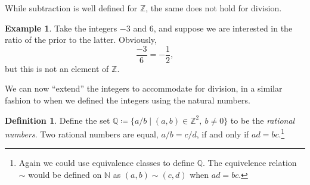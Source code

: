\documentclass{article}
\newcommand{\N}{\mathbb{N}}
\newcommand{\Q}{\mathbb{Q}}
\newcommand{\Z}{\mathbb{Z}}
\theoremstyle{definition}
\newtheorem{definition}{Definition}[section]
\newtheorem{example}{Example}[section]
\begin{document}
	While subtraction is well defined for $ \Z $, the same does not hold for division. 
	\begin{example}
		Take the integers $ -3 $ and 6, and suppose we are interested in the ratio of the prior to the latter. Obviously, $$ \frac{-3}{6}=-\frac{1}{2} ,$$ but this is not an element of $ \Z $. 
	\end{example}
	We can now ``extend'' the integers to accommodate for division, in a similar fashion to when we defined the integers using the natural numbers. 
	\begin{definition}
		Define the set $ \Q\coloneqq\{a/b\mid(a,b)\in\Z^2,\ b\neq0\} $ to be the \textit{\color{red}rational numbers}. Two rational numbers are equal, $ a/b=c/d $, if and only if $ ad=bc $.\footnote{Again we could use equivalence classes to define $ \Q $. The equivelence relation $ \sim $ would be defined on $ \N $ as $ (a,b)\sim(c,d) $ when $ ad=bc $.}  
	\end{definition}
\end{document}

